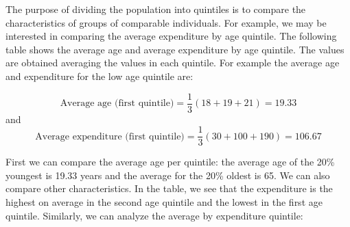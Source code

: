 \documentclass[letterpaper]{article}\usepackage[]{graphicx}\usepackage[]{color}
\numberwithin{exer}{section}
\theoremstyle{nonumberplain}
\begin{document}
\begin{center}
\end{center}

The purpose of dividing the population into quintiles is to compare
the characteristics of groups of comparable individuals. For example,
we may be interested in comparing the average expenditure by age
quintile. The following table shows the average age and average
expenditure by age quintile. The values are obtained averaging the
values in each quintile. For example the average age and expenditure
for the low age quintile are:

\[
\mbox{Average age (first quintile)} = \frac{1}{3}(18 + 
19 + 21)=19.33
\]
and
\[
\mbox{Average expenditure (first quintile)} = \frac{1}{3}(30 + 
100 + 190)=106.67
\]
\begin{center}
\end{center}
First we can compare the average age per quintile: the average age of
the 20\% youngest is 19.33 years and the average for the 20\%
oldest is 65. We can also compare other
characteristics. In the table, we see that the expenditure is the
highest on average in the second age quintile and the lowest in the
first age quintile. Similarly, we can analyze the average by
expenditure quintile:
\end{document}
